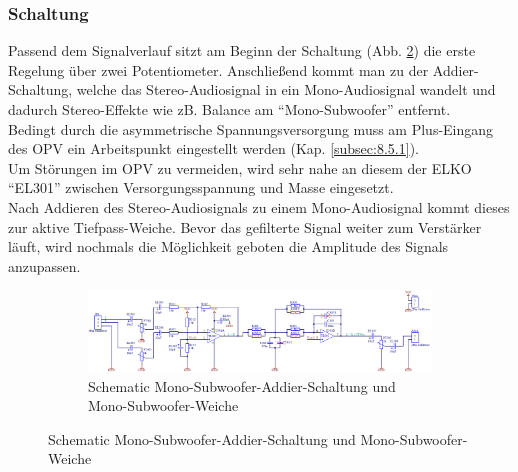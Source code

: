 \subsubsection{Schaltung}\label{subsec:5.5.2}
Passend dem Signalverlauf sitzt am Beginn der Schaltung (Abb. \ref{fig:5.5.2.1}) die erste Regelung über zwei Potentiometer.
Anschließend kommt man zu der Addier-Schaltung, welche das Stereo-Audiosignal in ein Mono-Audiosignal wandelt und dadurch Stereo-Effekte wie zB. Balance am \enquote{Mono-Subwoofer} entfernt.\\
Bedingt durch die asymmetrische Spannungsversorgung muss am Plus-Eingang des OPV ein Arbeitspunkt eingestellt werden (Kap. \ref{subsec:8.5.1}).\\
Um Störungen im OPV zu vermeiden, wird sehr nahe an diesem der ELKO \enquote{EL301} zwischen Versorgungsspannung und Masse eingesetzt.\\
Nach Addieren des Stereo-Audiosignals zu einem Mono-Audiosignal kommt dieses zur aktive Tiefpass-Weiche.
Bevor das gefilterte Signal weiter zum Verstärker läuft, wird nochmals die Möglichkeit geboten die Amplitude des Signals anzupassen.
\begin{figure}
	\begin{figure} [H]
		\centering
		\includegraphics[width=\linewidth,height=0.9\textheight,keepaspectratio]{img/Print3/3mTTWeicheruAddiererDiplSchematic.PNG}
		\caption{Schematic Mono-Subwoofer-Addier-Schaltung und Mono-Subwoofer-Weiche}
		\label {fig:5.5.2.1}
	\end{figure}
\end{figure}
	


